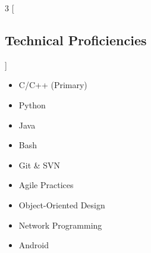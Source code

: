 \documentclass[11pt]{article}
\begin{document}
\begin{multicols}{3}
  [
    \subsection*{Technical Proficiencies}
  ]
  \begin{itemize}
    \raggedright
  \item C/C++ (Primary)
  \item Python
  \item Java
  \item Bash
  \item Git \& SVN
  \item Agile Practices
  \item Object-Oriented Design
  \item Network Programming
  \item Android
  \end{itemize}
\end{multicols}
\end{document}
